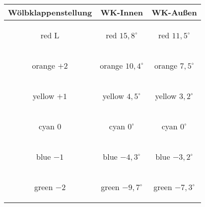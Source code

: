 \begin{center}
\begin{tabular}{|c|c|c|}
\hline
Wölbklappenstellung & WK-Innen & WK-Außen\\
\hline
\begin{color}{red} L \end{color} & \begin{color}{red} $15,8^{\circ}$ \end{color} & \begin{color}{red} $11,5^{\circ}$ \end{color}\\
\hline
\begin{color}{orange} $+2$ \end{color} & \begin{color}{orange} $10,4^{\circ}$ \end{color} & \begin{color}{orange} $7,5^{\circ}$ \end{color}\\
\hline
\begin{color}{yellow} $+1$ \end{color} & \begin{color}{yellow} $4,5^{\circ}$ \end{color} & \begin{color}{yellow} $3,2^{\circ}$ \end{color}\\
\hline
\begin{color}{cyan} $0$ \end{color} & \begin{color}{cyan} $0^{\circ}$ \end{color} & \begin{color}{cyan} $0^{\circ}$ \end{color}\\
\hline
\begin{color}{blue} $-1$ \end{color} & \begin{color}{blue} $-4,3^{\circ}$ \end{color} & \begin{color}{blue} $-3,2^{\circ}$ \end{color}\\
\hline
\begin{color}{green} $-2$ \end{color} & \begin{color}{green} $-9,7^{\circ}$ \end{color} & \begin{color}{green} $-7,3^{\circ}$ \end{color}\\
\hline

\end{tabular}
\end{center}
\newpage
